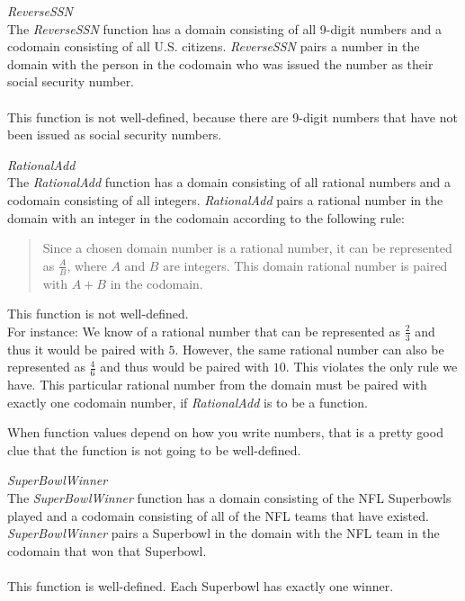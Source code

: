 \documentclass{ximera}
\begin{document}
\begin{example} \textit{ReverseSSN} \\
The \textit{ReverseSSN} function has a domain consisting of all 9-digit numbers and a codomain consisting of all U.S. citizens.  \textit{ReverseSSN} pairs a number in the domain with the person in the codomain who was issued the number as their social security number. 
\\ \\ 
This function is not well-defined, because there are 9-digit numbers that have not been issued as social security numbers.
\end{example}


\begin{example} \textit{RationalAdd} \\
The \textit{RationalAdd} function has a domain consisting of all rational numbers and a codomain consisting of all integers.  \textit{RationalAdd} pairs a rational number in the domain with an integer in the codomain according to the following rule: \\ 
\begin{quote}
Since a chosen domain number is a rational number, it can be represented as $\tfrac{A}{B}$, where $A$ and $B$ are integers. This domain rational number is paired with $A+B$ in the codomain.
\end{quote}
 
This function is not well-defined.  \\

For instance: We know of a rational number that can be represented as $\tfrac{2}{3}$ and thus it would be paired with $5$.  However, the same rational number can also be represented as $\tfrac{4}{6}$ and thus would be paired with $10$.  This violates the only rule we have.  This particular rational number from the domain must be paired with exactly one codomain number, if \textit{RationalAdd} is to be a function.

\begin{warning}
When function values depend on how you write numbers, that is a pretty good clue that the function is not going to be well-defined.
\end{warning}
\end{example}



\begin{example} \textit{SuperBowlWinner}  \\
The \textit{SuperBowlWinner} function has a domain consisting of the NFL Superbowls played and a codomain consisting of all of the NFL teams that have existed.  \textit{SuperBowlWinner} pairs a Superbowl in the domain with the NFL team in the codomain that won that Superbowl.  \\ 
\\
This function is well-defined. Each Superbowl has exactly one winner.
\end{example}
\end{document}
